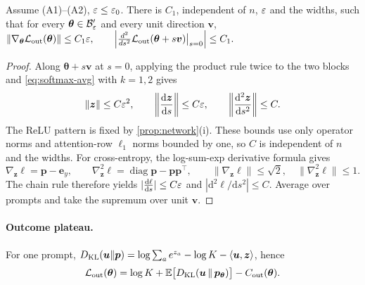 \begin{lemma}
\label{lem:end-smooth}
Assume (A1)--(A2), $\varepsilon\le\varepsilon_0$. There is $C_1$, independent of $n$, $\varepsilon$ and the widths, such that for every $\bm\theta\in\mathcal B_{\varepsilon}'$ and
every unit direction $\bm v$,
 $\|\nabla_{\bm\theta}\mathcal L_{\mathrm{out}}(\bm\theta)\|\le C_1\varepsilon,\qquad \Bigl|\frac{d^2}{ds^2}\mathcal L_{\mathrm{out}}(\bm\theta+s\bm v)\big|_{s=0}\Bigr|\le C_1 .$ 
\end{lemma}

\begin{proof}
Along $\bm\theta+s\bm v$ at $s=0$, applying the product rule twice to the
two blocks and \cref{eq:softmax-avg} with $k=1,2$ gives
\[
 \|\bm z\|\le C\initscale^2,\qquad
 \left\|\dd{\bm z}{s}\right\|\le C\initscale,\qquad
 \left\|\frac{\mathrm d^2\bm z}{\mathrm d s^2}\right\|\le C.
\]
The ReLU pattern is fixed by \cref{prop:network}(i). These bounds use only
operator norms and attention-row $\ell_1$ norms bounded by one, so $C$ is
independent of $n$ and the widths.
For cross-entropy, the log-sum-exp derivative formula
\citep[Section~3.1.5]{boyd2004convex} gives
\[
 \nabla_{\bm z}\ell=\bm p-\bm e_y,\qquad
 \nabla_{\bm z}^2\ell=\operatorname{diag}\bm p-\bm p\bm p^\top,
 \qquad \|\nabla_{\bm z}\ell\|\le\sqrt2,\quad
 \|\nabla_{\bm z}^2\ell\|\le1.
\]
The chain rule therefore yields
$|\dd{\ell}{s}|\le C\initscale$ and
$|\mathrm d^2\ell/\mathrm d s^2|\le C$.
Average over prompts and take the supremum over unit $\bm v$.
\end{proof}

\paragraph{Outcome plateau.}\label{app:end} For one prompt, $D_{\mathrm{KL}}(\bm u\|\bm p)=\log\sum_ae^{z_a}-\log K-\langle\bm u,\bm z\rangle$, hence
\begin{equation}
 \mathcal L_{\mathrm{out}}(\bm\theta)=\log K+\mathbb E\bigl[D_{\mathrm{KL}}(\bm u\,\|\,\bm p_{\bm\theta})\bigr]-C_{\mathrm{out}}(\bm\theta).
 \label{eq:lo-identity}
\end{equation}

